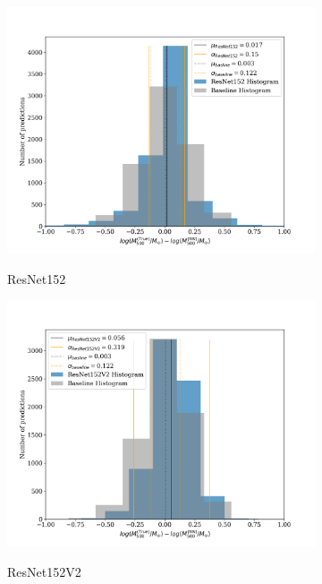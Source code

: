 \begin{figure}[H]
\begin{subfigure}{.325\textwidth}
    \includegraphics[width=\linewidth]{images/Chapter4/Results/training_ResNet152_hist.png}
    \label{fig:training_ResNet152_hist}
    \caption{ResNet152}
\end{subfigure}
\begin{subfigure}{.325\textwidth}
    \centering
    \includegraphics[width=\linewidth]{images/Chapter4/Results/training_ResNet152V2_hist.png}
    \label{fig:training_ResNet152V2_hist}
    \caption{ResNet152V2}
\end{subfigure}
\begin{subfigure}{.325\textwidth}
    \centering

\end{subfigure}
\end{figure}
